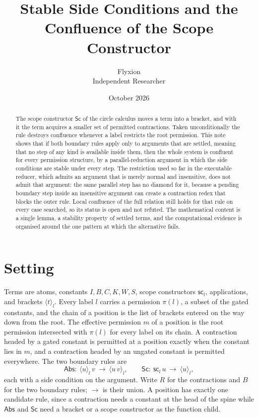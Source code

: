 \documentclass[11pt]{article}
\title{Stable Side Conditions and the Confluence of the Scope Constructor}
\author{Flyxion\\ Independent Researcher}
\date{October 2026}
\theoremstyle{definition}
\newcommand{\red}{\rightarrow}
\newcommand{\Sc}{\mathsf{Sc}}
\newcommand{\Abs}{\mathsf{Abs}}
\newcommand{\scn}[1]{\mathsf{sc}_{#1}}
\newcommand{\br}[2]{\langle #1\rangle_{#2}}
\begin{document}
\maketitle

\begin{abstract}
\noindent The scope constructor $\Sc$ of the circle calculus moves a term into a bracket, and with it the term acquires a smaller set of permitted contractions. Taken unconditionally the rule destroys confluence whenever a label restricts the root permission. This note shows that if both boundary rules apply only to arguments that are settled, meaning that no step of any kind is available inside them, then the whole system is confluent for every permission structure, by a parallel-reduction argument in which the side conditions are stable under every step. The restriction used so far in the executable reducer, which admits an argument that is merely normal and insensitive, does not admit that argument: the same parallel step has no diamond for it, because a pending boundary step inside an insensitive argument can create a contraction redex that blocks the outer rule. Local confluence of the full relation still holds for that rule on every case searched, so its status is open and not refuted. The mathematical content is a single lemma, a stability property of settled terms, and the computational evidence is organised around the one pattern at which the alternative fails.
\end{abstract}

\section{Setting}

Terms are atoms, constants $I,B,C,K,W,S$, scope constructors $\scn{l}$, applications, and brackets $\br{t}{l}$. Every label $l$ carries a permission $\pi(l)$, a subset of the gated constants, and the chain of a position is the list of brackets entered on the way down from the root. The effective permission $m$ of a position is the root permission intersected with $\pi(l)$ for every label on its chain. A contraction headed by a gated constant is permitted at a position exactly when the constant lies in $m$, and a contraction headed by an ungated constant is permitted everywhere. The two boundary rules are
\[
\Abs:\ \br{u}{l}\,v \ \red\ \br{u\,v}{l},
\qquad
\Sc:\ \scn{l}\,u \ \red\ \br{u}{l},
\]
each with a side condition on the argument. Write $R$ for the contractions and $B$ for the two boundary rules; $\red$ is their union. A position has exactly one candidate rule, since a contraction needs a constant at the head of the spine while $\Abs$ and $\Sc$ need a bracket or a scope constructor as the function child.
\end{document}
